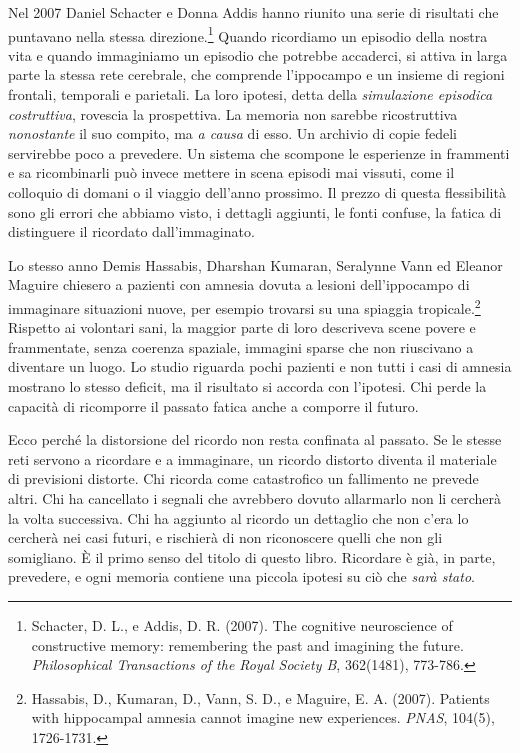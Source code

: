 Nel 2007 Daniel Schacter e Donna Addis hanno riunito una serie di risultati che puntavano nella stessa direzione.\footnote{Schacter, D. L., e Addis, D. R. (2007). The cognitive neuroscience of constructive memory: remembering the past and imagining the future. \textit{Philosophical Transactions of the Royal Society B}, 362(1481), 773-786.} Quando ricordiamo un episodio della nostra vita e quando immaginiamo un episodio che potrebbe accaderci, si attiva in larga parte la stessa rete cerebrale, che comprende l'ippocampo e un insieme di regioni frontali, temporali e parietali. La loro ipotesi, detta della \textit{simulazione episodica costruttiva}, rovescia la prospettiva. La memoria non sarebbe ricostruttiva \textit{nonostante} il suo compito, ma \textit{a causa} di esso. Un archivio di copie fedeli servirebbe poco a prevedere. Un sistema che scompone le esperienze in frammenti e sa ricombinarli può invece mettere in scena episodi mai vissuti, come il colloquio di domani o il viaggio dell'anno prossimo. Il prezzo di questa flessibilità sono gli errori che abbiamo visto, i dettagli aggiunti, le fonti confuse, la fatica di distinguere il ricordato dall'immaginato.

Lo stesso anno Demis Hassabis, Dharshan Kumaran, Seralynne Vann ed Eleanor Maguire chiesero a pazienti con amnesia dovuta a lesioni dell'ippocampo di immaginare situazioni nuove, per esempio trovarsi su una spiaggia tropicale.\footnote{Hassabis, D., Kumaran, D., Vann, S. D., e Maguire, E. A. (2007). Patients with hippocampal amnesia cannot imagine new experiences. \textit{PNAS}, 104(5), 1726-1731.} Rispetto ai volontari sani, la maggior parte di loro descriveva scene povere e frammentate, senza coerenza spaziale, immagini sparse che non riuscivano a diventare un luogo. Lo studio riguarda pochi pazienti e non tutti i casi di amnesia mostrano lo stesso deficit, ma il risultato si accorda con l'ipotesi. Chi perde la capacità di ricomporre il passato fatica anche a comporre il futuro.

Ecco perché la distorsione del ricordo non resta confinata al passato. Se le stesse reti servono a ricordare e a immaginare, un ricordo distorto diventa il materiale di previsioni distorte. Chi ricorda come catastrofico un fallimento ne prevede altri. Chi ha cancellato i segnali che avrebbero dovuto allarmarlo non li cercherà la volta successiva. Chi ha aggiunto al ricordo un dettaglio che non c'era lo cercherà nei casi futuri, e rischierà di non riconoscere quelli che non gli somigliano. È il primo senso del titolo di questo libro. Ricordare è già, in parte, prevedere, e ogni memoria contiene una piccola ipotesi su ciò che \textit{sarà stato}.

